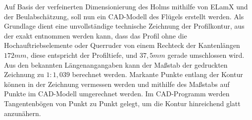 Auf Basis der verfeinerten Dimensionierung des Holms mithilfe von ELamX und der Beulabschätzung, soll nun ein CAD-Modell des Flügels erstellt werden. Als Grundlage dient eine unvollständige technische Zeichnung der Profilkontur, aus der exakt entnommen werden kann, dass das Profil ohne die Hochauftriebselemente oder Querruder von einem Rechteck der Kantenlängen $ 172mm $, diese entspricht der Profiltiefe, und $ 37,5mm $ gerade umschlossen wird. Aus den bekannten Längenangangaben kann der Maßstab der gedruckten Zeichnung zu $ 1:1,039 $ berechnet werden. Markante Punkte entlang der Kontur können in der Zeichnung vermessen werden und mithilfe des Maßstabs auf Punkte im CAD-Modell umgerechnet werden. Im CAD-Programm werden Tangentenbögen von Punkt zu Punkt gelegt, um die Kontur hinreichend glatt anzunähern.\\

